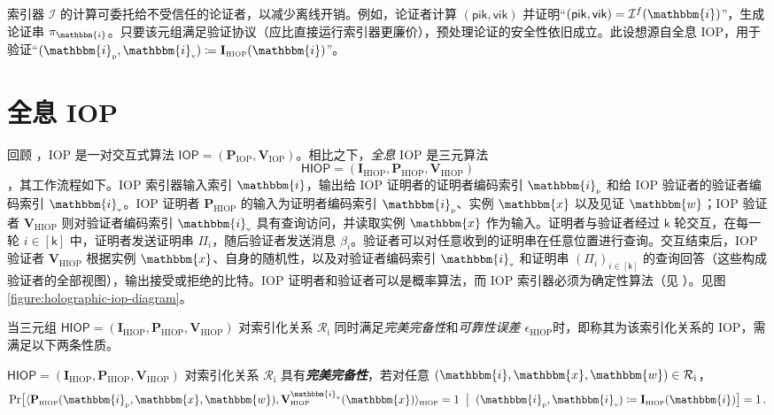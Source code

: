 \documentclass[american,singlepageview]{snargs-book-zh}
\renewcommand{\enspace}{\ensuremath{\thinspace}}
\newcommand{\defemph}[1]{\textbf{\emph{#1}}}
\newcommand{\Interact}[2]{\langle #1, #2 \rangle}
\newcommand{\DefineEqual}{\coloneqq}
\newcommand{\IndexedRelation}{\mathcal{R}_{\mathrm{i}}}
\newcommand{\Index}{\mathbbm{i}}
\newcommand{\Instance}{\mathbbm{x}}
\newcommand{\Witness}{\mathbbm{w}}
\newcommand{\ProtoIndexer}{I}
\newcommand{\ProtoProver}{P}
\newcommand{\ProtoVerifier}{V}
\newcommand{\ProtoSoundnessError}{\epsilon}
\newcommand{\ProtoRoundComplexity}{\mathsf{k}}
\newcommand{\RoundIndex}{i}
\newcommand{\IOPSymbol}{\mathsf{IOP}}
\newcommand{\IOPSubscript}{\scriptscriptstyle\mathrm{IOP}}
\newcommand{\IOPFormat}[1]{\mathbf{#1}}
\newcommand{\IOPProver}{\IOPFormat{\ProtoProver}_{\IOPSubscript}}
\newcommand{\IOPVerifier}{\IOPFormat{\ProtoVerifier}_{\IOPSubscript}}
\newcommand{\IOPSystem}{(\IOPProver,\IOPVerifier)}
\newcommand{\IOPString}{\Pi}
\newcommand{\IOPVerifierMessage}{\beta}
\newcommand{\IOPRoundComplexity}{\ProtoRoundComplexity}
\newcommand{\IOPStrings}{(\IOPString_{\RoundIndex})_{\RoundIndex \in [\IOPRoundComplexity]}}
\newcommand{\HIOPSubscript}{\scriptscriptstyle\mathrm{HIOP}}
\newcommand{\HIOPSymbol}{\mathsf{HIOP}}
\newcommand{\HIOPInteract}[2]{\Interact{#1}{#2}_{\HIOPSubscript}}
\newcommand{\HIOPIndexer}{\IOPFormat{\ProtoIndexer}_{\HIOPSubscript}}
\newcommand{\HIOPProver}{\IOPFormat{\ProtoProver}_{\HIOPSubscript}}
\newcommand{\HIOPVerifier}{\IOPFormat{\ProtoVerifier}_{\HIOPSubscript}}
\newcommand{\HIOPSystem}{(\HIOPIndexer,\HIOPProver,\HIOPVerifier)}
\newcommand{\ProverEncodedIndex}{\Index_{{\scriptscriptstyle\mathrm{p}}}}
\newcommand{\VerifierEncodedIndex}{\Index_{{\scriptscriptstyle\mathrm{v}}}}
\newcommand{\HIOPSoundnessError}{\ProtoSoundnessError_{\HIOPSubscript}}
\newcommand{\ARGFormat}[1]{\mathcal{#1}}
\newcommand{\ARGIndexer}{\ARGFormat{\ProtoIndexer}}
\newcommand{\ARGString}{\pi}
\newcommand{\ARGpik}{\mathsf{pik}}
\newcommand{\ARGvik}{\mathsf{vik}}
\newcommand{\ROFunction}{f}
\begin{document}
\begin{remark}[委托索引器计算]
\label{remark:delegating-the-indexer}
索引器 $\ARGIndexer$ 的计算可委托给不受信任的论证者，以减少离线开销。例如，论证者计算
$(\ARGpik,\ARGvik)$ 并证明“$(\ARGpik,\ARGvik)=\ARGIndexer^{\ROFunction}(\Index)$”，生成论证串 $\ARGString_{\Index}$。只要该元组满足验证协议（应比直接运行索引器更廉价），预处理论证的安全性依旧成立。此设想源自全息 IOP，用于验证“$(\ProverEncodedIndex,\VerifierEncodedIndex)
  \DefineEqual \HIOPIndexer(\Index)$”。
\end{remark}

\section{全息 IOP}
\label{section:holographic-iop}

回顾 ，IOP 是一对交互式算法 $\IOPSymbol=\IOPSystem$。相比之下，\emph{全息} IOP 是三元算法
\begin{equation*}
\HIOPSymbol=\HIOPSystem
\end{equation*}
，其工作流程如下。IOP 索引器输入索引 $\Index$，输出给 IOP 证明者的证明者编码索引 $\ProverEncodedIndex$ 和给 IOP 验证者的验证者编码索引 $\VerifierEncodedIndex$。IOP 证明者 $\HIOPProver$ 的输入为证明者编码索引 $\ProverEncodedIndex$、实例 $\Instance$ 以及见证 $\Witness$；IOP 验证者 $\HIOPVerifier$ 则对验证者编码索引 $\VerifierEncodedIndex$ 具有查询访问，并读取实例 $\Instance$ 作为输入。证明者与验证者经过 $\IOPRoundComplexity$ 轮交互，在每一轮 $\RoundIndex\in[\IOPRoundComplexity]$ 中，证明者发送证明串 $\IOPString_{\RoundIndex}$，随后验证者发送消息 $\IOPVerifierMessage_{\RoundIndex}$。验证者可以对任意收到的证明串在任意位置进行查询。交互结束后，IOP 验证者 $\HIOPVerifier$ 根据实例 $\Instance$、自身的随机性，以及对验证者编码索引 $\VerifierEncodedIndex$ 和证明串 $\IOPStrings$ 的查询回答（这些构成验证者的全部视图），输出接受或拒绝的比特。IOP 证明者和验证者可以是概率算法，而 IOP 索引器必须为确定性算法（见 ）。见图 \ref{figure:holographic-iop-diagram}。

当三元组 $\HIOPSymbol=\HIOPSystem$ 对索引化关系 $\IndexedRelation$ 同时满足\emph{完美完备性}和\emph{可靠性误差 $\HIOPSoundnessError$}时，即称其为该索引化关系的 IOP，需满足以下两条性质。

\begin{definition}
\label{definition:hiop-completeness}
$\HIOPSymbol=\HIOPSystem$ 对索引化关系 $\IndexedRelation$ 具有\defemph{完美完备性}，若对任意 $(\Index,\Instance,\Witness)\in\IndexedRelation$，
\[
\Pr\bigl[
  \HIOPInteract{\HIOPProver(\ProverEncodedIndex,\Instance,\Witness)}
             {\HIOPVerifier^{\VerifierEncodedIndex}(\Instance)}=1
\;\bigm|\;
  (\ProverEncodedIndex,\VerifierEncodedIndex)\DefineEqual\HIOPIndexer(\Index)
\bigr]
=1
\enspace.
\]
\end{definition}
\end{document}
